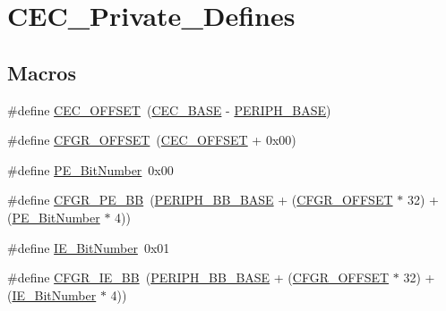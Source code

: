 \hypertarget{group___c_e_c___private___defines}{}\section{C\+E\+C\+\_\+\+Private\+\_\+\+Defines}
\label{group___c_e_c___private___defines}
\subsection*{Macros}
\begin{DoxyCompactItemize}
\item 
\#define \hyperlink{group___c_e_c___private___defines_ga675324bd8967b75f32554f50210821af}{C\+E\+C\+\_\+\+O\+F\+F\+S\+ET}~(\hyperlink{group___peripheral__memory__map_gaacb77bc44b3f8c87ab98f241e760e440}{C\+E\+C\+\_\+\+B\+A\+SE} -\/ \hyperlink{openmotestm_2library_2inc_2stm32f10x__map_8h_a9171f49478fa86d932f89e78e73b88b0}{P\+E\+R\+I\+P\+H\+\_\+\+B\+A\+SE})
\item 
\#define \hyperlink{group___c_e_c___private___defines_ga8682298330c3b9bae1992e4f1a0af985}{C\+F\+G\+R\+\_\+\+O\+F\+F\+S\+ET}~(\hyperlink{group___c_e_c___private___defines_ga675324bd8967b75f32554f50210821af}{C\+E\+C\+\_\+\+O\+F\+F\+S\+ET} + 0x00)
\item 
\#define \hyperlink{group___c_e_c___private___defines_ga321e547b9574b065127c882e09a4f7e7}{P\+E\+\_\+\+Bit\+Number}~0x00
\item 
\#define \hyperlink{group___c_e_c___private___defines_ga9d1f044508cda5ad8213bd7bc5c4363d}{C\+F\+G\+R\+\_\+\+P\+E\+\_\+\+BB}~(\hyperlink{openmotestm_2library_2inc_2stm32f10x__map_8h_aed7efc100877000845c236ccdc9e144a}{P\+E\+R\+I\+P\+H\+\_\+\+B\+B\+\_\+\+B\+A\+SE} + (\hyperlink{openmotestm_2library_2src_2stm32f10x__rcc_8c_a8682298330c3b9bae1992e4f1a0af985}{C\+F\+G\+R\+\_\+\+O\+F\+F\+S\+ET} $\ast$ 32) + (\hyperlink{group___c_e_c___private___defines_ga321e547b9574b065127c882e09a4f7e7}{P\+E\+\_\+\+Bit\+Number} $\ast$ 4))
\item 
\#define \hyperlink{group___c_e_c___private___defines_ga57731312db52f3498312a56e98166fad}{I\+E\+\_\+\+Bit\+Number}~0x01
\item 
\#define \hyperlink{group___c_e_c___private___defines_gac7fe35cf912353ca51a56c5f1f25b2fb}{C\+F\+G\+R\+\_\+\+I\+E\+\_\+\+BB}~(\hyperlink{openmotestm_2library_2inc_2stm32f10x__map_8h_aed7efc100877000845c236ccdc9e144a}{P\+E\+R\+I\+P\+H\+\_\+\+B\+B\+\_\+\+B\+A\+SE} + (\hyperlink{openmotestm_2library_2src_2stm32f10x__rcc_8c_a8682298330c3b9bae1992e4f1a0af985}{C\+F\+G\+R\+\_\+\+O\+F\+F\+S\+ET} $\ast$ 32) + (\hyperlink{group___c_e_c___private___defines_ga57731312db52f3498312a56e98166fad}{I\+E\+\_\+\+Bit\+Number} $\ast$ 4))

\end{DoxyCompactItemize}
